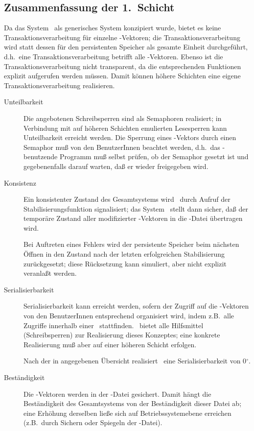 \subsection{Zusammenfassung der 1.\ Schicht}
%
Da das System \postore\ als generisches System konzipiert wurde,
bietet es keine Transaktionsverarbeitung f\"{u}r einzelne
\postore-Vektoren; die Transaktionsverarbeitung wird statt dessen f\"{u}r
den persistenten Speicher als gesamte Einheit durchgef\"{u}hrt, d.h.\ eine
Transaktionsverarbeitung betrifft alle \postore-Vektoren. Ebenso ist
die Transaktionsverarbeitung nicht transparent, da die entsprechenden
Funktionen explizit aufgerufen werden m\"{u}ssen.  Damit k\"{o}n\-nen h\"{o}here
Schichten eine eigene Transaktionsverarbeitung realisieren.
\begin{description}
%
\item[Unteilbarkeit]
Die angebotenen Schreibsperren sind als Semaphoren
\cite[]{bib:je87} realisiert; in Verbindung mit auf
h\"{o}heren Schichten emulierten Lesesperren
\cite[]{bib:mu91} \cite[]{bib:br92} kann
Unteilbarkeit erreicht werden. Die Sperrung eines \postore-Vektors
durch einen Semaphor mu\ss{} von den BenutzerInnen beachtet werden,
d.h.\ das \postore-be\-nut\-zen\-de Programm mu\ss{} selbst pr\"{u}fen, ob
der Semaphor gesetzt ist und gegebenenfalls darauf warten, da\ss{} er
wieder freigegeben wird.
%
\item[Konsistenz]
Ein konsistenter Zustand des Gesamtsystems wird \postore\ durch Aufruf
der Stabilisierungsfunktion signalisiert; das System \postore\ stellt
dann sicher, da\ss{} der tem\-po\-r\"{a}\-re Zustand aller modifizierter
\postore-Vektoren in die \sh-Datei \"{u}bertragen wird.
%
\par{}Bei Auftreten eines Fehlers wird der persistente Speicher beim
n\"{a}chsten \"{O}ffnen in den Zustand nach der letzten erfolgreichen
Stabilisierung zur\"{u}ckgesetzt; diese R\"{u}cksetzung kann simuliert, aber
nicht explizit veranla\ss{}t werden.
%
\item[Serialisierbarkeit]
Serialisierbarkeit kann erreicht werden, sofern der Zugriff auf die
\postore-Vektoren von den BenutzerInnen entsprechend organisiert
wird, indem z.B.\ alle Zugriffe innerhalb einer
\twophasetr\ stattfinden. \postore\ bietet alle Hilfsmittel
(Schreibsperren) zur Realisierung dieses Konzeptes; eine konkrete
Realisierung mu\ss{} aber auf einer h\"{o}heren Schicht erfolgen.
%
\par{}Nach der in \cite[]{bib:gr93} angegebenen
\"{U}bersicht realisiert \postore\ eine Serialisierbarkeit von
0$^{\circ}$.
%
\item[Best\"{a}ndigkeit]
Die \postore-Vektoren werden in der \sh-Datei gesichert. Damit h\"{a}ngt
die Best\"{a}ndigkeit des Gesamtsystems von der Best\"{a}ndigkeit dieser
Datei ab; eine Er\-h\"{o}\-hung derselben lie\ss{}e sich auf
Betriebssystemebene erreichen (z.B.\ durch Sichern oder Spiegeln der
\sh-Datei).
%
\end{description}

